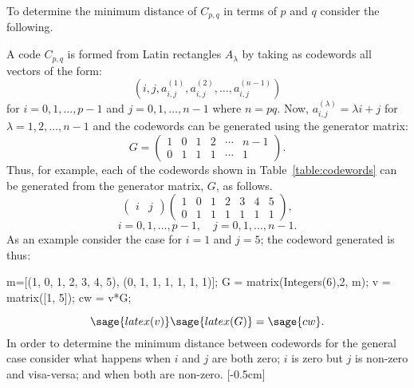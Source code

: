 To determine the minimum distance of $C_{p,q}$ in terms of $p$ and $q$ consider the following.

A code $C_{p,q}$ is formed from Latin rectangles $A_\lambda$ by taking as codewords all vectors of the form:
\[
	(i,j, a^{(1)}_{i,j}, a^{(2)}_{i,j},\ldots,a^{(n-1)}_{i,j})
\]
for $i=0,1,\ldots,p-1$ and $j=0,1,\ldots,n-1$ where $n=pq$. Now, $a^{(\lambda)}_{i,j} = \lambda i + j$ for $\lambda =1,2,\dots,n-1$ and the codewords can be generated using the generator matrix:
\[
	G = 
	\begin{pmatrix}
	1 & 0 & 1 & 2 & \cdots & n-1 \\ 
	0 & 1 & 1 & 1 & \cdots & 1
	\end{pmatrix}. 
\]
Thus, for example, each of the codewords shown in Table~\ref{table:codewords} can be generated from the generator matrix, $G$, as follows.
\[
	\begin{pmatrix} i & j\end{pmatrix}
	\begin{pmatrix}
	1 & 0 & 1 & 2 & 3 & 4 & 5\\ 
	0 & 1 & 1 & 1 & 1 & 1 & 1 
	\end{pmatrix}, 
\]
\[
i=0,1,\ldots,p-1,\quad j=0,1,\ldots,n-1.
\]
As an example consider the case for $i=1$ and $j=5$; the codeword generated is thus:
\begin{sagesilent}
m=[(1, 0, 1, 2, 3, 4, 5), 
   (0, 1, 1, 1, 1, 1, 1)]; 
G = matrix(Integers(6),2, m);
v = matrix([1, 5]);
cw = v*G;
\end{sagesilent}
\[
	\sage{latex(v)}\sage{latex(G)}=\sage{cw}.
\]
In order to determine the minimum distance between codewords for the general case consider what happens when $i$ and $j$ are both zero; $i$ is zero but $j$ is non-zero and visa-versa; and when both are non-zero. [-0.5cm]


